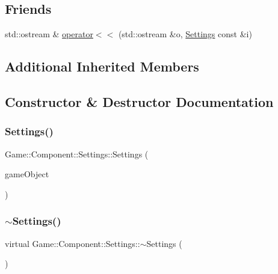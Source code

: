 \subsection*{Friends}
\begin{DoxyCompactItemize}
\item 
std\+::ostream \& \mbox{\hyperlink{class_game_1_1_component_1_1_settings_a2fac0e654b3e111d2eaa4472da05740d}{operator$<$$<$}} (std\+::ostream \&o, \mbox{\hyperlink{class_game_1_1_component_1_1_settings}{Settings}} const \&i)
\end{DoxyCompactItemize}
\subsection*{Additional Inherited Members}


\subsection{Constructor \& Destructor Documentation}
\mbox{\label{class_game_1_1_component_1_1_settings_a2a0d16fdd698140da965cd3367601a49}} 
\subsubsection{\texorpdfstring{Settings()}{Settings()}}
{\footnotesize\ttfamily Game\+::\+Component\+::\+Settings\+::\+Settings (\begin{DoxyParamCaption}\item[{\mbox{\hyperlink{class_beer_engine_1_1_game_object}{Beer\+Engine\+::\+Game\+Object}} $\ast$}]{game\+Object }\end{DoxyParamCaption})}

\mbox{\label{class_game_1_1_component_1_1_settings_ad6ce9d5380a251f7a46c4360419211eb}} 
\subsubsection{\texorpdfstring{$\sim$\+Settings()}{~Settings()}}
{\footnotesize\ttfamily virtual Game\+::\+Component\+::\+Settings\+::$\sim$\+Settings (\begin{DoxyParamCaption}\item[{void}]{ }\end{DoxyParamCaption})\hspace{0.3cm}{\ttfamily [virtual]}}



